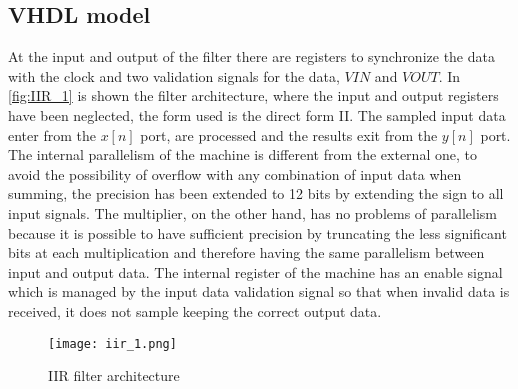 \subsection{VHDL model}
At the input and output of the filter there are registers to synchronize the data with the clock and two validation signals for the data, $VIN$ and $VOUT$. In \autoref{fig:IIR_1} is shown the filter architecture, where the input and output registers have been neglected, the form used is the direct form II. The sampled input data enter from the $x[n]$ port, are processed and the results exit from the $y[n]$ port. The internal parallelism of the machine is different from the external one, to avoid the possibility of overflow with any combination of input data when summing, the precision has been extended to 12 bits by extending the sign to all input signals. The multiplier, on the other hand, has no problems of parallelism because it is possible to have sufficient precision by truncating the less significant bits at each multiplication and therefore having the same parallelism between input and output data. The internal register of the machine has an enable signal which is managed by the input data validation signal so that when invalid data is received, it does not sample keeping the correct output data.

\begin{figure}[h]
	\center
	\texttt{[image: iir\_1.png]}
	\caption{IIR filter architecture}
	\label{fig:IIR_1}
\end{figure}